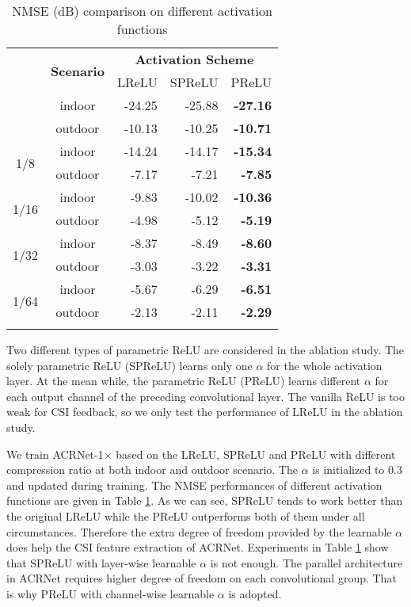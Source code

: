 \documentclass[12pt, draftclsnofoot, onecolumn]{IEEEtran}
\begin{document}
\begin{table}[!t]
\caption{NMSE (dB) comparison on different activation functions}
\begin{center}
\makegapedcells \renewcommand\tabcolsep{10pt}
\begin{tabular}{c c | r r r}
\Xhline{0.8pt}
\multirow{2}{*}{$\eta$} & \multirow{2}{*}{\textbf{Scenario}}
  & \multicolumn{3}{c}{\textbf{Activation Scheme}} \\
& & LReLU & SPReLU & PReLU \\
\Xhline{0.8pt}
\multirow{2}{*}{1/4}
  & indoor & -24.25 & -25.88 & \textbf{-27.16} \\
  & outdoor & -10.13 & -10.25 & \textbf{-10.71} \\
\hline
\multirow{2}{*}{1/8}
  & indoor & -14.24 & -14.17 & \textbf{-15.34} \\
  & outdoor & -7.17 & -7.21 & \textbf{-7.85} \\
\hline
\multirow{2}{*}{1/16}
  & indoor & -9.83 & -10.02 & \textbf{-10.36} \\
  & outdoor & -4.98 & -5.12 & \textbf{-5.19} \\
\hline
\multirow{2}{*}{1/32}
  & indoor & -8.37 & -8.49 & \textbf{-8.60} \\
  & outdoor & -3.03 & -3.22 & \textbf{-3.31} \\
\hline
\multirow{2}{*}{1/64}
  & indoor & -5.67 & -6.29 & \textbf{-6.51} \\
  & outdoor & -2.13 & -2.11 & \textbf{-2.29} \\
\hline
\Xhline{0.8pt}
\end{tabular}
\label{tab3}
\end{center}
\end{table}

Two different types of parametric ReLU are considered in the ablation study. The solely parametric ReLU (SPReLU) learns only one $\alpha$ for the whole activation layer. At the mean while, the parametric ReLU (PReLU) learns different $\alpha$ for each output channel of the preceding convolutional layer. The vanilla ReLU is too weak for CSI feedback, so we only test the performance of LReLU in the ablation study.

We train ACRNet-1$\times$ based on the LReLU, SPReLU and PReLU with different compression ratio at both indoor and outdoor scenario. The $\alpha$ is initialized to 0.3 and updated during training. The NMSE performances of different activation functions are given in Table \ref{tab3}. As we can see, SPReLU tends to work better than the original LReLU while the PReLU outperforms both of them under all circumstances. Therefore the extra degree of freedom provided by the learnable $\alpha$ does help the CSI feature extraction of ACRNet. Experiments in Table \ref{tab3} show that SPReLU with layer-wise learnable $\alpha$ is not enough. The parallel architecture in ACRNet requires higher degree of freedom on each convolutional group. That is why PReLU with channel-wise learnable $\alpha$ is adopted.
\end{document}
